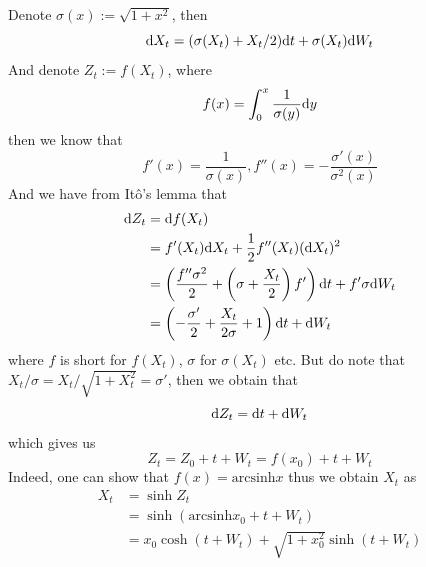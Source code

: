 \documentclass{homework}
\newcommand{\arcsinh}{\mathrm{arcsinh}}
\begin{document}
\begin{subproblem}
        \item
        Denote
        $\sigma(x):=\sqrt{1+x^2}$, then
        \[\mathrm d X_t=(\sigma(X_t)+X_t/2)\mathrm d t+\sigma(X_t)\mathrm d W_t\]
        And denote $Z_t:=f(X_t)$, where
        \[f(x)=\int_0^x\frac{1}{\sigma(y)}\mathrm d y\]
        then we know that
        \[f'(x)=\frac{1}{\sigma(x)},f''(x)=-\frac{\sigma'(x)}{\sigma^2(x)}\]
        And we have from It\^o's lemma that
        \[\begin{aligned}
            \mathrm d Z_t&=\mathrm d f(X_t)\\
            &=f'(X_t)\mathrm d X_t+\frac{1}{2}f''(X_t)(\mathrm d X_t)^2\\
            &=\left(\frac{f''\sigma^2}{2}
            +\left(\sigma+\frac{X_t}{2}\right)f'\right)\mathrm d t
            +f'\sigma\mathrm d W_t\\
            &=\left(-\frac{\sigma'}{2}+\frac{X_t}{2\sigma}+1\right)\mathrm d t+\mathrm d W_t
        \end{aligned}\]
        where $f$ is short for $f(X_t)$, $\sigma$ for $\sigma(X_t)$ etc.
        But do note that $X_t/\sigma=X_t/\sqrt{1+X_t^2}=\sigma'$, then
        we obtain that
        \[\mathrm d Z_t=\mathrm d t+\mathrm d W_t\]
        which gives us
        \[Z_t=Z_0+t+W_t=f(x_0)+t+W_t\]
        Indeed, one can show that $f(x)=\arcsinh x$
        thus we obtain $X_t$ as
        \[\begin{aligned}
            X_t&=\sinh Z_t\\
            &=\sinh(\arcsinh x_0+t+W_t)\\
            &=x_0\cosh(t+W_t)+\sqrt{1+x_0^2}\sinh(t+W_t)
        \end{aligned}\]
    \end{subproblem}
    
\end{document}
